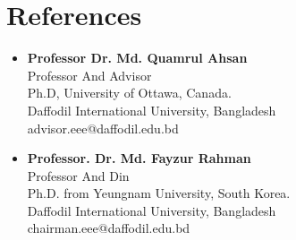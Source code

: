 \documentclass[11pt,a4paper,sans]{moderncv}        %
\begin{document}
\section{References}

\vspace{6pt}
 
\begin{itemize}

\item \textbf{Professor Dr. Md. Quamrul Ahsan} \\Professor And Advisor\\ Ph.D, University of   Ottawa, Canada.\\ Daffodil International University, Bangladesh\\advisor.eee@daffodil.edu.bd

\vspace{10pt}

\item \textbf{Professor. Dr. Md. Fayzur Rahman} \\Professor And Din\\ Ph.D. from Yeungnam University, South Korea. \\Daffodil International University, Bangladesh\\chairman.eee@daffodil.edu.bd

\end{itemize}

\nocite{*}



\end{document}
